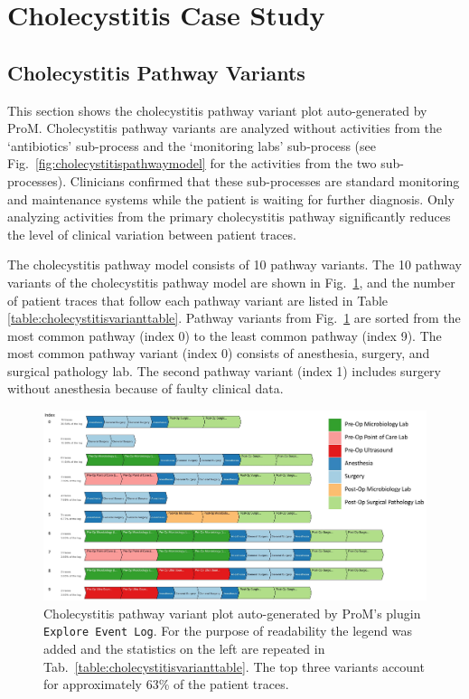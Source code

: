 \documentclass{article}
\begin{document}
\newcommand{\plugin}[1]{\texttt{#1}}
\section{Cholecystitis Case Study}
\label{sec:Cholecystitis}
\subsection{Cholecystitis Pathway Variants}
This section shows the cholecystitis pathway variant plot auto-generated by ProM. Cholecystitis pathway variants are analyzed without activities from the `antibiotics' sub-process and the `monitoring labs' sub-process (see Fig.~\ref{fig:cholecystitispathwaymodel} for the activities from the two sub-processes). Clinicians confirmed that these sub-processes are standard monitoring and maintenance systems while the patient is waiting for further diagnosis. Only analyzing activities from the primary cholecystitis pathway significantly reduces the level of clinical variation between patient traces.

The cholecystitis pathway model consists of 10 pathway variants. The 10 pathway variants of the cholecystitis pathway model are shown in Fig.~\ref{fig:cholecystitispathwayvariants}, and the number of patient traces that follow each pathway variant are listed in Table \ref{table:cholecystitisvarianttable}. Pathway variants from Fig.~\ref{fig:cholecystitispathwayvariants} are sorted from the most common pathway (index 0) to the least common pathway (index 9). The most common pathway variant (index 0) consists of anesthesia, surgery, and surgical pathology lab. The second pathway variant (index 1) includes surgery without anesthesia because of faulty clinical data.

\begin{figure}[t]
\hspace{-2cm}
\includegraphics[width=1.5\textwidth]{cholecystitis_variant_index_anes.jpg}
\caption{Cholecystitis pathway variant plot auto-generated by ProM's plugin \plugin{Explore Event Log}. For the purpose of readability the legend was added and the statistics on the left are repeated in Tab.~\ref{table:cholecystitisvarianttable}.
The top three variants account for approximately 63\% of the patient traces.}
\label{fig:cholecystitispathwayvariants}
\end{figure}
\end{document}
